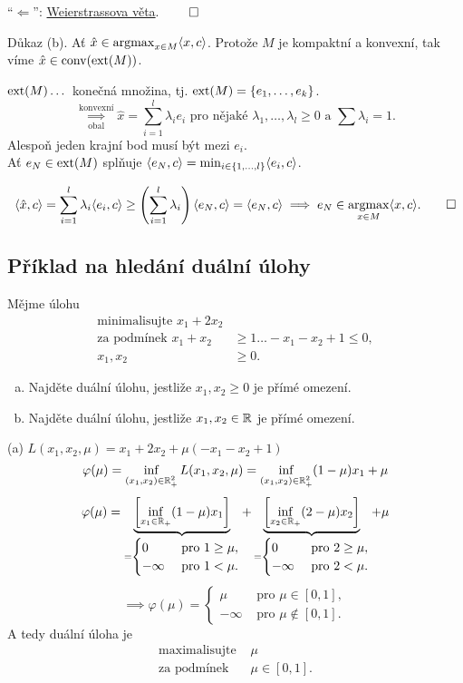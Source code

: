 \enquote{$\Leftarrow$}: \href{https://cs.wikipedia.org/wiki/Weierstrassova_v%C4%9Bta}{Weierstrassova věta}. $\qed$

Důkaz (b). Ať $\hat x \in \operatorname*{argmax}_{x \in M} \langle x,c\rangle$. Protože $M$ je kompaktní a konvexní, tak víme
$\hat x \in \operatorname{conv}(\operatorname{ext}(M))$.

$\operatorname{ext}(M) \dots$ konečná množina, tj. $\operatorname{ext}(M) = \left\lbrace e_1, \dots, e_k \right\rbrace$.
\[
    \underset{\text{obal}}{\overset{\text{konvexní}}{\implies}} \hat x = \sum_{i=1}^{l} \lambda_i e_i \text{ pro nějaké }
    \lambda_1, \dots, \lambda_l \geq 0 \text{ a } \sum \lambda_i = 1.
\]
Alespoň jeden krajní bod musí být mezi $e_i$.\\
Ať $e_N \in \operatorname{ext}(M)$ splňuje $\langle e_N, c\rangle = \min_{i \in \left\lbrace 1, \dots, l \right\rbrace} \langle e_i, c\rangle$.

\[
    \langle \hat x, c\rangle = \sum_{i=1}^{l} \lambda_i \langle e_i, c\rangle \geq \left(\sum_{i=1}^{l} \lambda_i\right)
    \langle e_N, c\rangle = \langle e_N, c\rangle \implies e_N \in \operatorname*{argmax}_{x \in M} \langle x, c\rangle. \qed
\]

\subsection{Příklad na hledání duální úlohy}
Mějme úlohu
\begin{align*}
    \text{minimalisujte } x_1 + 2x_2 \\
    \text{za podmínek } x_1 + x_2 &\geq 1 \dots -x_1 -x_2 + 1 \leq 0, \\
    x_1, x_2 &\geq 0.
\end{align*}
\begin{enumerate}[(a)]
    \item Najděte duální úlohu, jestliže $x_1, x_2 \geq 0$ je přímé omezení.
    \item Najděte duální úlohu, jestliže $x_1, x_2 \in \mathbb{R}$ je přímé omezení.
\end{enumerate}
(a) $L(x_1, x_2, \mu) = x_1 + 2x_2 + \mu(-x_1 -x_2 + 1)$
\[
    \varphi(\mu) = \inf_{(x_1, x_2) \in \mathbb{R}_+^2} L(x_1, x_2, \mu) = \inf_{(x_1, x_2) \in \mathbb{R}_+^2} (1-\mu)x_1 + \mu
\]
\[
    \varphi(\mu) = \underbrace{\left[\inf_{x_1 \in \mathbb{R}_+} (1-\mu)x_1\right]}_{=
    \begin{cases}
        0 &\text{ pro } 1 \geq \mu, \\
        - \infty &\text{ pro } 1 < \mu.
    \end{cases}} + \underbrace{\left[\inf_{x_2 \in \mathbb{R}_+} (2-\mu)x_2\right]}_{=
    \begin{cases}
        0 &\text{ pro } 2 \geq \mu, \\
        - \infty &\text{ pro } 2 < \mu.
    \end{cases}} + \mu
\]
\[
    \implies \varphi(\mu) =
    \begin{cases}
        \mu &\text{ pro } \mu \in [0,1], \\
        -\infty &\text{ pro } \mu \not\in [0,1].
    \end{cases}
\]
A tedy duální úloha je
\begin{align*}
    \text{maximalisujte }& \mu \\
    \text{za podmínek }& \mu \in [0,1].
\end{align*}

